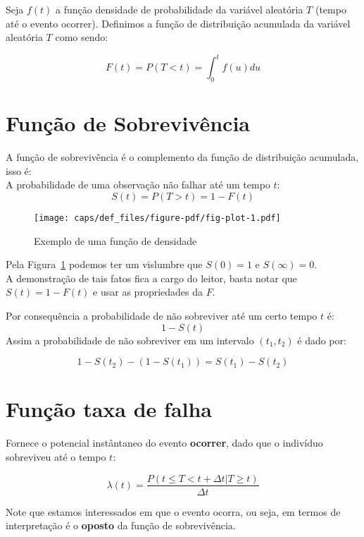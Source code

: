 \documentclass[
  letterpaper,
  DIV=11,
  numbers=noendperiod]{scrreprt}
\begin{document}
Seja \(f(t)\) a função densidade de probabilidade da variável aleatória
\(T\) (tempo até o evento ocorrer). Definimos a função de distribuição
acumulada da variável aleatória \(T\) como sendo:

\[
F(t) = P(T < t) = \int_{0}^{t}f(u)du
\]

\hypertarget{funuxe7uxe3o-de-sobrevivuxeancia}{%
\section{Função de
Sobrevivência}\label{funuxe7uxe3o-de-sobrevivuxeancia}}

A função de sobrevivência é o complemento da função de distribuição
acumulada, isso é:\\
A probabilidade de uma observação não falhar até um tempo \(t\): \[
S(t) = P(T>t) = 1 - F(t) 
\]

\begin{figure}

{\centering \texttt{[image: caps/def\_files/figure-pdf/fig-plot-1.pdf]}

}

\caption{\label{fig-plot}Exemplo de uma função de densidade}

\end{figure}

Pela Figura~\ref{fig-plot} podemos ter um vislumbre que \(S(0) = 1\) e
\(S(\infty) = 0\).\\
A demonstração de tais fatos fica a cargo do leitor, basta notar que
\(S(t) = 1 - F(t)\) e usar as propriedades da \(F\).

Por consequência a probabilidade de não sobreviver até um certo tempo
\(t\) é: \[
1- S(t)
\] Assim a probabilidade de não sobreviver em um intervalo \((t_1,t_2)\)
é dado por:

\[
1-S(t_2) - (1-S(t_1)) = S(t_1) - S(t_2)
\]

\hypertarget{funuxe7uxe3o-taxa-de-falha}{%
\section{Função taxa de falha}\label{funuxe7uxe3o-taxa-de-falha}}

Fornece o potencial instântaneo do evento \textbf{ocorrer}, dado que o
indivíduo sobreviveu até o tempo \(t\):

\[
\lambda(t)= \dfrac{P(t \leq T < t + \Delta t| T \geq t )}{\Delta t}
\]

Note que estamos interessados em que o evento ocorra, ou seja, em termos
de interpretação é o \textbf{oposto} da função de sobrevivência.
\end{document}
